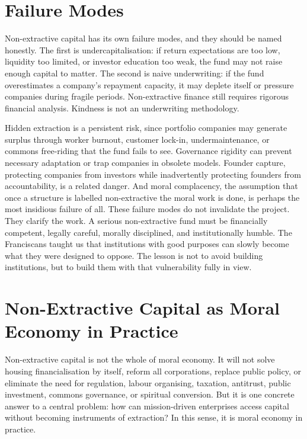 \documentclass[11pt,a4paper,oneside]{book}
\begin{document}
\section*{Failure Modes}

Non-extractive capital has its own failure modes, and they should be named honestly. The first is undercapitalisation: if return expectations are too low, liquidity too limited, or investor education too weak, the fund may not raise enough capital to matter. The second is naive underwriting: if the fund overestimates a company's repayment capacity, it may deplete itself or pressure companies during fragile periods. Non-extractive finance still requires rigorous financial analysis. Kindness is not an underwriting methodology.

Hidden extraction is a persistent risk, since portfolio companies may generate surplus through worker burnout, customer lock-in, undermaintenance, or commons free-riding that the fund fails to see. Governance rigidity can prevent necessary adaptation or trap companies in obsolete models. Founder capture, protecting companies from investors while inadvertently protecting founders from accountability, is a related danger. And moral complacency, the assumption that once a structure is labelled non-extractive the moral work is done, is perhaps the most insidious failure of all. These failure modes do not invalidate the project. They clarify the work. A serious non-extractive fund must be financially competent, legally careful, morally disciplined, and institutionally humble. The Franciscans taught us that institutions with good purposes can slowly become what they were designed to oppose. The lesson is not to avoid building institutions, but to build them with that vulnerability fully in view.

\section*{Non-Extractive Capital as Moral Economy in Practice}

Non-extractive capital is not the whole of moral economy. It will not solve housing financialisation by itself, reform all corporations, replace public policy, or eliminate the need for regulation, labour organising, taxation, antitrust, public investment, commons governance, or spiritual conversion. But it is one concrete answer to a central problem: how can mission-driven enterprises access capital without becoming instruments of extraction? In this sense, it is moral economy in practice.
\end{document}
